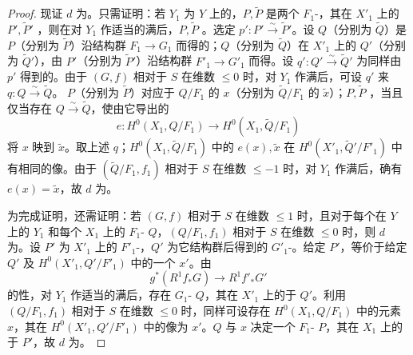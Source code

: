 \begin{proof}
现证 $d$ 为。只需证明：若 $Y_1$ 为 $Y$ 上的，$P,\widetilde P$ 是两个 $F_1$-，其在 $X'_1$ 上的 $P',\widetilde P'$ ，则在对 $Y_1$ 作适当的满后，$P,\widetilde P$ 。选定 $p':P'\xrightarrow{\sim}\widetilde P'$。设 $Q$（分别为 $\widetilde Q$）是 $P$（分别为 $\widetilde P$）沿结构群 $F_1\to G_1$ 而得的；$Q$（分别为 $\widetilde Q$）在 $X'_1$ 上的 $Q'$（分别为 $\widetilde Q'$），由 $P'$（分别为 $\widetilde P'$）沿结构群 $F'_1\to G'_1$ 而得。设 $q':Q'\xrightarrow{\sim}\widetilde Q'$ 为同样由 $p'$ 得到的。由于 $(G,f)$ 相对于 $S$ 在维数 $\leqslant0$ 时，对 $Y_1$ 作满后，可设 $q'$ 来 $q:Q\xrightarrow{\sim}\widetilde Q$。 $P$（分别为 $\widetilde P$）对应于 $Q/F_1$ 的 $x$（分别为 $\widetilde Q/F_1$ 的 $\widetilde x$）；$P,\widetilde P$ ，当且仅当存在 $Q\xrightarrow{\sim}\widetilde Q$，使由它导出的
\[e:H^0(X_1,Q/F_1)\longrightarrow H^0(X_1,\widetilde Q/F_1)\]
将 $x$ 映到 $\widetilde x$。取上述 $q$；$H^0(X_1,\widetilde Q/F_1)$ 中的 $e(x),\widetilde x$ 在 $H^0(X'_1,\widetilde Q'/F'_1)$ 中有相同的像。由于 $(\widetilde Q/F_1,f_1)$ 相对于 $S$ 在维数 $\leqslant-1$ 时，对 $Y_1$ 作满后，确有 $e(x)=\widetilde x$，故 $d$ 为。

为完成证明，还需证明：若 $(G,f)$ 相对于 $S$ 在维数 $\leqslant1$ 时，且对于每个在 $Y$ 上的 $Y_1$ 和每个 $X_1$ 上的 $F_1$- $Q$，$(Q/F_1,f_1)$ 相对于 $S$ 在维数 $\leqslant0$ 时，则 $d$ 为。设 $P'$ 为 $X'_1$ 上的 $F'_1$-，$Q'$ 为它结构群后得到的 $G'_1$-。给定 $P'$，等价于给定 $Q'$ 及 $H^0(X'_1,Q'/F'_1)$ 中的一个 $x'$。由
\[g^*(R^1f_*G)\longrightarrow R^1f'_*G'\]
的性，对 $Y_1$ 作适当的满后，存在 $G_1$- $Q$，其在 $X'_1$ 上的于 $Q'$。利用 $(Q/F_1,f_1)$ 相对于 $S$ 在维数 $\leqslant0$ 时，同样可设存在 $H^0(X_1,Q/F_1)$ 中的元素 $x$，其在 $H^0(X'_1,Q'/F'_1)$ 中的像为 $x'$。$Q$ 与 $x$ 决定一个 $F_1$- $P$，其在 $X_1$ 上的于 $P'$，故 $d$ 为。


\end{proof}

